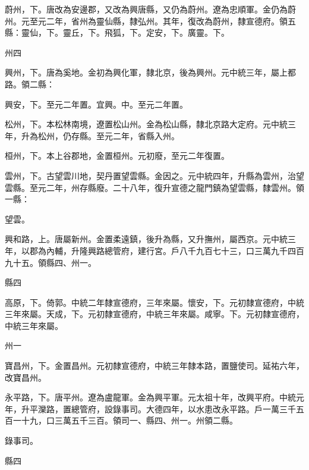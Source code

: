 \begin{pinyinscope}
 蔚州，下。唐改為安邊郡，又改為興唐縣，又仍為蔚州。遼為忠順軍。金仍為蔚州。元至元二年，省州為靈仙縣，隸弘州。其年，復改為蔚州，隸宣德府。領五縣：靈仙，下。靈丘，下。飛狐，下。定安，下。廣靈。下。



 州四



 興州，下。唐為奚地。金初為興化軍，隸北京，後為興州。元中統三年，屬上都路。領二縣：



 興安，下。至元二年置。宜興。中。至元二年置。



 松州，下。本松林南境，遼置松山州。金為松山縣，隸北京路大定府。元中統三年，升為松州，仍存縣。至元二年，省縣入州。



 桓州，下。本上谷郡地，金置桓州。元初廢，至元二年復置。



 雲州，下。古望雲川地，契丹置望雲縣。金因之。元中統四年，升縣為雲州，治望雲縣。至元二年，州存縣廢。二十八年，復升宣德之龍門鎮為望雲縣，隸雲州。領一縣：



 望雲。



 興和路，上。唐屬新州。金置柔遠鎮，後升為縣，又升撫州，屬西京。元中統三年，以郡為內輔，升隆興路總管府，建行宮。戶八千九百七十三，口三萬九千四百九十五。領縣四、州一。



 縣四



 高原，下。倚郭。中統二年隸宣德府，三年來屬。懷安，下。元初隸宣德府，中統三年來屬。天成，下。元初隸宣德府，中統三年來屬。咸寧。下。元初隸宣德府，中統三年來屬。



 州一



 寶昌州，下。金置昌州。元初隸宣德府，中統三年隸本路，置鹽使司。延祐六年，改寶昌州。



 永平路，下。唐平州。遼為盧龍軍。金為興平軍。元太祖十年，改興平府。中統元年，升平灤路，置總管府，設錄事司。大德四年，以水患改永平路。戶一萬三千五百一十九，口三萬五千三百。領司一、縣四、州一。州領二縣。



 錄事司。



 縣四




\end{pinyinscope}
